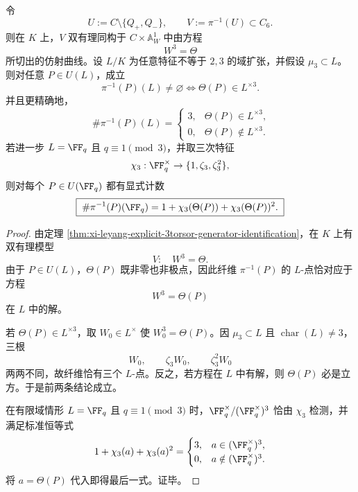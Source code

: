\begin{theorem}\label{thm:xi-leyang-kummer-fiber-cubic-residue-criterion}
令
\[
U:=C\setminus\{Q_+,Q_-\},
\qquad
V:=\pi^{-1}(U)\subset C_6.
\]
则在 \(K\) 上，\(V\) 双有理同构于 \(C\times\mathbb A^1_W\) 中由方程
\[
W^3=\Theta
\]
所切出的仿射曲线。设 \(L/K\) 为任意特征不等于 \(2,3\) 的域扩张，并假设 \(\mu_3\subset L\)。则对任意 \(P\in U(L)\)，成立
\[
\boxed{\;
\pi^{-1}(P)(L)\neq\varnothing
\iff
\Theta(P)\in L^{\times 3}.\;}
\]
并且更精确地，
\[
\boxed{\;
\#\pi^{-1}(P)(L)=
\begin{cases}
3,& \Theta(P)\in L^{\times 3},\\
0,& \Theta(P)\notin L^{\times 3}.
\end{cases}}
\]
若进一步 \(L=\FF_q\) 且 \(q\equiv 1\pmod 3\)，并取三次特征
\[
\chi_3:\FF_q^\times\to\{1,\zeta_3,\zeta_3^2\},
\]
则对每个 \(P\in U(\FF_q)\) 都有显式计数
\[
\boxed{\;
\#\pi^{-1}(P)(\FF_q)
=
1+\chi_3(\Theta(P))+\chi_3(\Theta(P))^2.\;}
\]
\end{theorem}
\begin{proof}
由定理 \ref{thm:xi-leyang-explicit-3torsor-generator-identification}，在 \(K\) 上有双有理模型
\[
V:\quad W^3=\Theta.
\]
由于 \(P\in U(L)\)，\(\Theta(P)\) 既非零也非极点，因此纤维 \(\pi^{-1}(P)\) 的 \(L\)-点恰对应于方程
\[
W^3=\Theta(P)
\]
在 \(L\) 中的解。

若 \(\Theta(P)\in L^{\times 3}\)，取 \(W_0\in L^\times\) 使 \(W_0^3=\Theta(P)\)。因 \(\mu_3\subset L\) 且 \(\operatorname{char}(L)\neq 3\)，三根
\[
W_0,\qquad \zeta_3W_0,\qquad \zeta_3^2W_0
\]
两两不同，故纤维恰有三个 \(L\)-点。反之，若方程在 \(L\) 中有解，则 \(\Theta(P)\) 必是立方。于是前两条结论成立。

在有限域情形 \(L=\FF_q\) 且 \(q\equiv 1\pmod 3\) 时，\(\FF_q^\times/(\FF_q^\times)^3\) 恰由 \(\chi_3\) 检测，并满足标准恒等式
\[
1+\chi_3(a)+\chi_3(a)^2=
\begin{cases}
3,& a\in (\FF_q^\times)^3,\\
0,& a\notin (\FF_q^\times)^3.
\end{cases}
\]
将 \(a=\Theta(P)\) 代入即得最后一式。证毕。
\end{proof}

